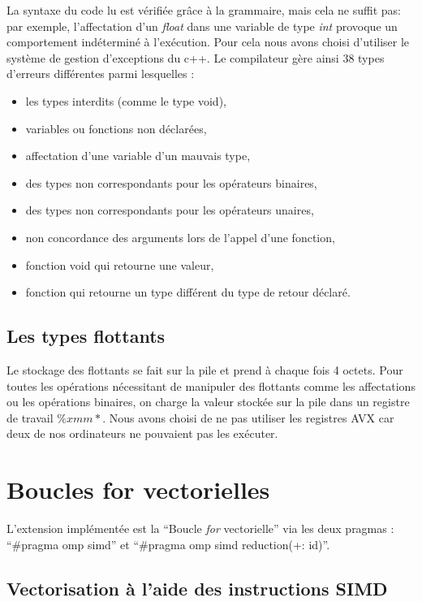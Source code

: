 \documentclass[a4paper,8pt,french,fleqn]{article}
\begin{document}
La syntaxe du code lu est vérifiée grâce à la grammaire, mais cela ne suffit pas: par exemple, l'affectation d'un \textit{float} dans une variable de type \textit{int} provoque un comportement indéterminé à l'exécution. Pour cela nous avons choisi d'utiliser le système de gestion d'exceptions du c++. Le compilateur gère ainsi 38 types d'erreurs différentes parmi lesquelles : 
\begin{itemize}
\item les types interdits (comme le type void),
\item variables ou fonctions non déclarées,
\item affectation d'une variable d'un mauvais type,
\item des types non correspondants pour les opérateurs binaires,
\item des types non correspondants pour les opérateurs unaires,
\item non concordance des arguments lors de l'appel d'une fonction,
\item fonction void qui retourne une valeur,
\item fonction qui retourne un type différent du type de retour déclaré.
\end{itemize}

\subsection{Les types flottants}
Le stockage des flottants se fait sur la pile et prend à chaque fois 4 octets. Pour toutes les opérations nécessitant de manipuler des flottants comme les affectations ou les opérations binaires, on charge la valeur stockée sur la pile dans un registre de travail $\%xmm*$. Nous avons choisi de ne pas utiliser les registres AVX car deux de nos ordinateurs ne pouvaient pas les exécuter. 

\section{Boucles for vectorielles}
L'extension implémentée est la ``Boucle \textit{for} vectorielle'' via les deux pragmas : ``\#pragma omp simd'' et ``\#pragma omp simd reduction(+: id)''.

\subsection{Vectorisation à l'aide des instructions SIMD}
\end{document}
